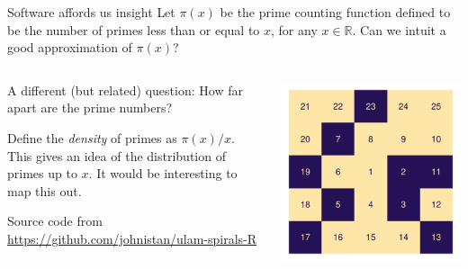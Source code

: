 \documentclass[,aspectratio=169]{beamer}
\newcommand{\bbR}{\mathbb{R}}
\begin{document}
\begin{frame}{Software affords us insight}
\protect\hypertarget{software-affords-us-insight}{}
Let \(\pi(x)\) be the prime counting function defined to be the number
of primes less than or equal to \(x\), for any \(x\in\bbR\). Can we
intuit a good approximation of \(\pi(x)\)?

\vspace{1em}
\pause

\begin{columns}[T]
\begin{column}{0.48\textwidth}
\vspace{1em}

A different (but related) question: How far apart are the prime numbers?

\vspace{1em}
\pause

Define the \emph{density} of primes as \(\pi(x)/x\). This gives an idea
of the distribution of primes up to \(x\). It would be interesting to
map this out.

\vspace{1em}

\footnotesize

Source code from \url{https://github.com/johnistan/ulam-spirals-R}
\end{column}

\begin{column}{0.48\textwidth}
\vspace{-1.5em}

\begin{center}\includegraphics[width=0.85\linewidth]{figure/unnamed-chunk-2-1} \end{center}
\end{column}
\end{columns}
\end{frame}
\end{document}
